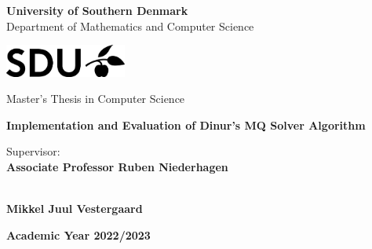 \begin{titlepage}
    \begin{center}
        {\LARGE \textbf{University of Southern Denmark}} \\
        \vspace{0.2cm}
        {\Large {Department of Mathematics and Computer Science}} \\ 
        \vspace{1cm}
        
        \includegraphics[width=4cm]{figures/SDU-no-title.png} \\
        \vspace{1cm}
        
        {\Large {Master's Thesis in Computer Science}} \\
        \vspace{6cm}
        
        {\LARGE \textbf{Implementation and Evaluation of Dinur's MQ Solver Algorithm}} \\ 
        \vspace{1cm}
        
        \end{center}
        
        \begin{multicols}{2}
        \noindent \large{Supervisor:} \\
        \large{\textbf{Associate Professor Ruben Niederhagen}} \\
        \columnbreak
        
         \\
        \large{\textbf{Mikkel Juul Vestergaard}} \\
        \end{multicols}
        \vspace{4cm}
        
        \begin{center}
            \large{\textbf{Academic Year 2022/2023}}
        \end{center}        
\end{titlepage}

